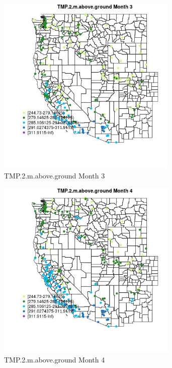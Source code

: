 \begin{figure} 
\centering  
\includegraphics[width=0.77\textwidth]{Code_Outputs/Report_ML_input_PM25_Step4_part_e_de_duplicated_aveswNAs_MapObsMo3TMP2maboveground.jpg} 
\caption{\label{fig:Report_ML_input_PM25_Step4_part_e_de_duplicated_aveswNAsMapObsMo3TMP2maboveground}TMP.2.m.above.ground Month 3} 
\end{figure} 
 

\begin{figure} 
\centering  
\includegraphics[width=0.77\textwidth]{Code_Outputs/Report_ML_input_PM25_Step4_part_e_de_duplicated_aveswNAs_MapObsMo4TMP2maboveground.jpg} 
\caption{\label{fig:Report_ML_input_PM25_Step4_part_e_de_duplicated_aveswNAsMapObsMo4TMP2maboveground}TMP.2.m.above.ground Month 4} 
\end{figure} 
 

